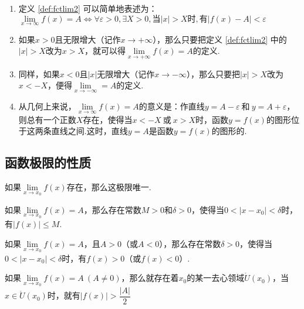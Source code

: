 \documentclass[lang=cn,10pt]{elegantbook}
\begin{document}
\begin{note}
	\begin{enumerate}
		\item 定义 \ref{def:fctlim2} 可以简单地表述为：\( \lim\limits_{x \to \infty}f(x) = A \Leftrightarrow \forall \varepsilon > 0, \exists X > 0,\text{当}|x|>X\text{时},\text{有}|f(x) - A| < \varepsilon \)
		\item 如果\( x > 0 \)且无限增大（记作\( x \to +\infty \)），那么只要把定义 \ref{def:fctlim2} 中的\( |x| > X \)改为\( x > X \)，就可以得\( \lim\limits_{x \to +\infty}f(x) = A \)的定义.
		\item 同样，如果\( x < 0 \)且\( |x| \)无限增大（记作\( x \to -\infty \)），那么只要把\( |x| > X \)改为\( x < -X \)，便得\( \lim\limits_{x \to -\infty} = A \)的定义.
		\item 从几何上来说，\( \lim\limits_{x \to \infty}f(x) = A \)的意义是：作直线\( y = A - \varepsilon\ \text{和}\ y = A + \varepsilon \)，则总有一个正数\( X \)存在，使得当\( x < -X\ \text{或}\ x > X \)时，函数\( y = f(x) \)的图形位于这两条直线之间.这时，直线\( y = A \)是函数\( y = f(x) \)的图形的.
	\end{enumerate}
\end{note}

\subsection{函数极限的性质}

\begin{theorem}[唯一性]
	如果\( \lim\limits_{x \to x_{0}}f(x) \)存在，那么这极限唯一.
\end{theorem}
\begin{theorem}[局部有界性]
	如果\( \lim\limits_{x \to x_{0}}f(x) = A \)，那么存在常数\( M > 0 \)和\( \delta > 0 \)，使得当\( 0 < |x - x_{0}| < \delta \)时，有\( |f(x)| \leqslant M \).
\end{theorem}
\begin{theorem}[局部保号性]
	如果\( \lim\limits_{x \to x_{0}}f(x) = A \)，且\( A > 0 \)（或\( A < 0 \)），那么存在常数\( \delta > 0 \)，使得当\( 0 < |x - x_{0}| < \delta \)时，有\( f(x) > 0 \)（或\( f(x) < 0 \)）.
\end{theorem}

\begin{theorem}
	如果\( \lim\limits_{x \to x _{0}}f(x) = A\ (A \neq 0) \)，那么就存在着\( x_{0} \)的某一去心领域\( \mathring{U}(x_{0}) \)，当\( x \in \mathring{U}(x_{0}) \)时，就有\( |f(x) | > \dfrac{|A|}{2} \)
\end{theorem}
\end{document}
